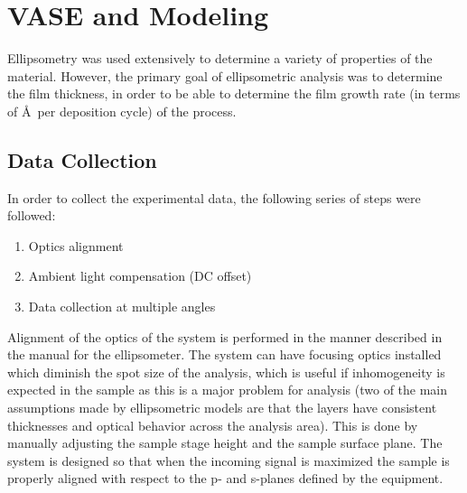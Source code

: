 \section{VASE and Modeling}
\label{sec:Methods-Ellip}

Ellipsometry was used extensively to determine a variety of properties of the material. However, the primary goal of ellipsometric analysis was to determine the film thickness, in order to be able to determine the film growth rate (in terms of \AA\ per deposition cycle) of the process. 


\subsection{Data Collection}

In order to collect the experimental data, the following series of steps were followed:

\begin{enumerate}
	\item
	Optics alignment
	\item
	Ambient light compensation (DC offset)
	\item
	Data collection at multiple angles
\end{enumerate}

Alignment of the optics of the system is performed in the manner described in the manual for the ellipsometer.\cite{WVASE-manual} The system can have focusing optics installed which diminish the spot size of the analysis, which is useful if inhomogeneity is expected in the sample as this is a major problem for analysis (two of the main assumptions made by ellipsometric models are that the layers have consistent thicknesses and optical behavior across the analysis area). This is done by manually adjusting the sample stage height and the sample surface plane. The system is designed so that when the incoming signal is maximized the sample is properly aligned with respect to the p- and s-planes defined by the equipment. 


